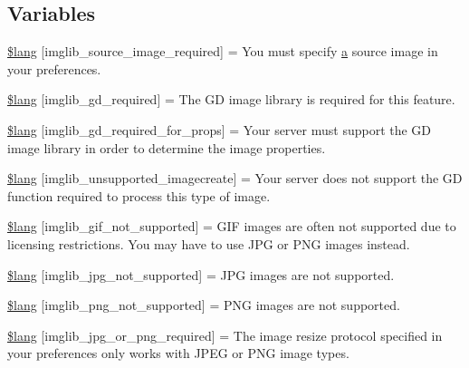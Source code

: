 \subsection*{Variables}
\begin{DoxyCompactItemize}
\item 
\mbox{\hyperlink{imglib__lang_8php_a0e78e52ac28b62198df5426515ee244a}{\$lang}} \mbox{[}\textquotesingle{}imglib\+\_\+source\+\_\+image\+\_\+required\textquotesingle{}\mbox{]} = \textquotesingle{}You must specify \mbox{\hyperlink{interfacea}{a}} source image in your preferences.\textquotesingle{}
\item 
\mbox{\hyperlink{imglib__lang_8php_ae6dd0286e69bea8e877cd8baf8de324d}{\$lang}} \mbox{[}\textquotesingle{}imglib\+\_\+gd\+\_\+required\textquotesingle{}\mbox{]} = \textquotesingle{}The GD image library is required for this feature.\textquotesingle{}
\item 
\mbox{\hyperlink{imglib__lang_8php_ad69126a87cfb27620a5d58be46563bcd}{\$lang}} \mbox{[}\textquotesingle{}imglib\+\_\+gd\+\_\+required\+\_\+for\+\_\+props\textquotesingle{}\mbox{]} = \textquotesingle{}Your server must support the GD image library in order to determine the image properties.\textquotesingle{}
\item 
\mbox{\hyperlink{imglib__lang_8php_a9dc04ad51d5895995c4acfb1c85a91a9}{\$lang}} \mbox{[}\textquotesingle{}imglib\+\_\+unsupported\+\_\+imagecreate\textquotesingle{}\mbox{]} = \textquotesingle{}Your server does not support the GD function required to process this type of image.\textquotesingle{}
\item 
\mbox{\hyperlink{imglib__lang_8php_ae2e1546517c4009456862caccbb29751}{\$lang}} \mbox{[}\textquotesingle{}imglib\+\_\+gif\+\_\+not\+\_\+supported\textquotesingle{}\mbox{]} = \textquotesingle{}G\+IF images are often not supported due to licensing restrictions. You may have to use J\+PG or P\+NG images instead.\textquotesingle{}
\item 
\mbox{\hyperlink{imglib__lang_8php_a6c8f078ef05e97a16b8765f982d9d880}{\$lang}} \mbox{[}\textquotesingle{}imglib\+\_\+jpg\+\_\+not\+\_\+supported\textquotesingle{}\mbox{]} = \textquotesingle{}J\+PG images are not supported.\textquotesingle{}
\item 
\mbox{\hyperlink{imglib__lang_8php_aab97ef0400eb277eb78af8b9709d3aa4}{\$lang}} \mbox{[}\textquotesingle{}imglib\+\_\+png\+\_\+not\+\_\+supported\textquotesingle{}\mbox{]} = \textquotesingle{}P\+NG images are not supported.\textquotesingle{}
\item 
\mbox{\hyperlink{imglib__lang_8php_ab63bd5a170e4132141fa0db22343ee56}{\$lang}} \mbox{[}\textquotesingle{}imglib\+\_\+jpg\+\_\+or\+\_\+png\+\_\+required\textquotesingle{}\mbox{]} = \textquotesingle{}The image resize protocol specified in your preferences only works with J\+P\+EG or P\+NG image types.\textquotesingle{}

\end{DoxyCompactItemize}
